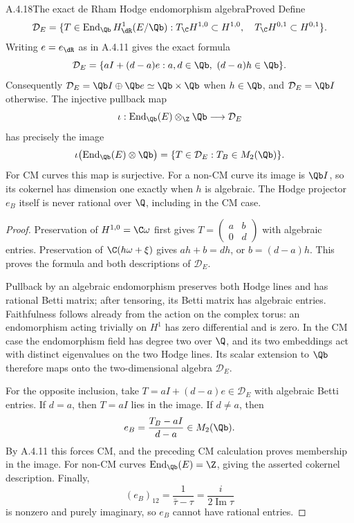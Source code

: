 \begin{result}{A.4.18}{The exact de Rham Hodge endomorphism algebra}{Proved}
Define
\[
 \mathcal D_E=\{T\in\operatorname{End}_{\Qb}H^1_{\dR}(E/\Qb):
 T_\C H^{1,0}\subset H^{1,0},\quad T_\C H^{0,1}\subset H^{0,1}\}.
\]
Writing $e=e_{\dR}$ as in A.4.11 gives the exact formula
\[
 \mathcal D_E
 =\{aI+(d-a)e:a,d\in\Qb,\ (d-a)h\in\Qb\}.
\]
Consequently $\mathcal D_E=\Qb I\oplus\Qb e\simeq\Qb\times\Qb$ when $h\in\Qb$, and $\mathcal D_E=\Qb I$ otherwise. The injective pullback map
\[
 \iota:\operatorname{End}_{\Qb}(E)\otimes_{\Z}\Qb
 \longrightarrow\mathcal D_E
\]
has precisely the image
\[
 \iota\bigl(\operatorname{End}_{\Qb}(E)\otimes\Qb\bigr)
 =\{T\in\mathcal D_E:T_B\in M_2(\Qb)\}.
\]
For CM curves this map is surjective. For a non-CM curve its image is $\Qb I$, so its cokernel has dimension one exactly when $h$ is algebraic. The Hodge projector $e_B$ itself is never rational over $\Q$, including in the CM case.
\end{result}
\begin{proof}
Preservation of $H^{1,0}=\C\omega$ first gives
$T=\left(\begin{smallmatrix}a&b\\0&d\end{smallmatrix}\right)$ with algebraic entries. Preservation of $\C(h\omega+\xi)$ gives $ah+b=dh$, or $b=(d-a)h$. This proves the formula and both descriptions of $\mathcal D_E$.

Pullback by an algebraic endomorphism preserves both Hodge lines and has rational Betti matrix; after tensoring, its Betti matrix has algebraic entries. Faithfulness follows already from the action on the complex torus: an endomorphism acting trivially on $H^1$ has zero differential and is zero. In the CM case the endomorphism field has degree two over $\Q$, and its two embeddings act with distinct eigenvalues on the two Hodge lines. Its scalar extension to $\Qb$ therefore maps onto the two-dimensional algebra $\mathcal D_E$.

For the opposite inclusion, take $T=aI+(d-a)e\in\mathcal D_E$ with algebraic Betti entries. If $d=a$, then $T=aI$ lies in the image. If $d\ne a$, then
\[
 e_B=\frac{T_B-aI}{d-a}\in M_2(\Qb).
\]
By A.4.11 this forces CM, and the preceding CM calculation proves membership in the image. For non-CM curves $\operatorname{End}_{\Qb}(E)=\Z$, giving the asserted cokernel description. Finally,
\[
 (e_B)_{12}=\frac1{\bar\tau-\tau}=\frac{i}{2\operatorname{Im}\tau}
\]
is nonzero and purely imaginary, so $e_B$ cannot have rational entries.
\end{proof}

